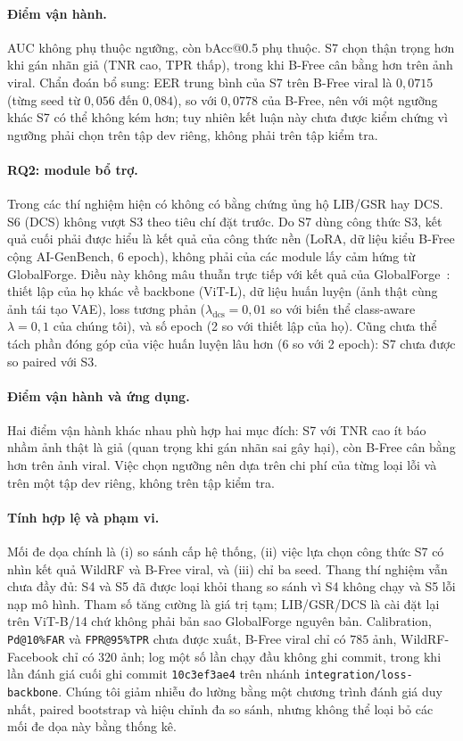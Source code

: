 \documentclass[11pt,a4paper]{article}
\begin{document}
\paragraph{Điểm vận hành.} AUC không phụ thuộc ngưỡng, còn bAcc@0.5 phụ thuộc. S7 chọn thận trọng hơn khi gán nhãn giả (TNR cao, TPR thấp), trong khi B-Free cân bằng hơn trên ảnh viral. Chẩn đoán bổ sung: EER trung bình của S7 trên B-Free viral là $0{,}0715$ (từng seed từ $0{,}056$ đến $0{,}084$), so với $0{,}0778$ của B-Free, nên với một ngưỡng khác S7 có thể không kém hơn; tuy nhiên kết luận này chưa được kiểm chứng vì ngưỡng phải chọn trên tập dev riêng, không phải trên tập kiểm tra.

\paragraph{RQ2: module bổ trợ.} Trong các thí nghiệm hiện có không có bằng chứng ủng hộ LIB/GSR hay DCS. S6 (DCS) không vượt S3 theo tiêu chí đặt trước. Do S7 dùng công thức S3, kết quả cuối phải được hiểu là kết quả của công thức nền (LoRA, dữ liệu kiểu B-Free cộng AI-GenBench, 6 epoch), không phải của các module lấy cảm hứng từ GlobalForge. Điều này không mâu thuẫn trực tiếp với kết quả của GlobalForge~\cite{cui2026globalforge}: thiết lập của họ khác về backbone (ViT-L), dữ liệu huấn luyện (ảnh thật cùng ảnh tái tạo VAE), loss tương phản ($\lambda_{\text{dcs}}=0{,}01$ so với biến thể class-aware $\lambda=0{,}1$ của chúng tôi), và số epoch (2 so với thiết lập của họ). Cũng chưa thể tách phần đóng góp của việc huấn luyện lâu hơn (6 so với 2 epoch): S7 chưa được so paired với S3.

\paragraph{Điểm vận hành và ứng dụng.} Hai điểm vận hành khác nhau phù hợp hai mục đích: S7 với TNR cao ít báo nhầm ảnh thật là giả (quan trọng khi gán nhãn sai gây hại), còn B-Free cân bằng hơn trên ảnh viral. Việc chọn ngưỡng nên dựa trên chi phí của từng loại lỗi và trên một tập dev riêng, không trên tập kiểm tra.

\paragraph{Tính hợp lệ và phạm vi.} Mối đe dọa chính là (i) so sánh cấp hệ thống, (ii) việc lựa chọn công thức S7 có nhìn kết quả WildRF và B-Free viral, và (iii) chỉ ba seed. Thang thí nghiệm vẫn chưa đầy đủ: S4 và S5 đã được loại khỏi thang so sánh vì S4 không chạy và S5 lỗi nạp mô hình. Tham số tăng cường là giá trị tạm; LIB/GSR/DCS là cài đặt lại trên ViT-B/14 chứ không phải bản sao GlobalForge nguyên bản. Calibration, \texttt{Pd@10\%FAR} và \texttt{FPR@95\%TPR} chưa được xuất, B-Free viral chỉ có $785$ ảnh, WildRF-Facebook chỉ có $320$ ảnh; log một số lần chạy đầu không ghi commit, trong khi lần đánh giá cuối ghi commit \texttt{10c3ef3ae4} trên nhánh \texttt{integration/loss-backbone}. Chúng tôi giảm nhiễu đo lường bằng một chương trình đánh giá duy nhất, paired bootstrap và hiệu chỉnh đa so sánh, nhưng không thể loại bỏ các mối đe dọa này bằng thống kê.
\end{document}
